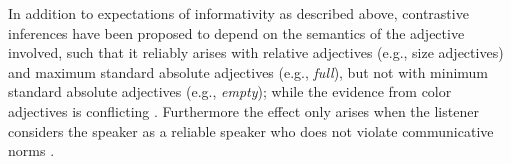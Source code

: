\documentclass[10pt,letterpaper]{article}
\newcommand{\ek}[1]{\textcolor{Orange}{[ek: #1]}}
\newcommand{\jd}[1]{\textcolor{Purple}{[jd: #1]}}
\begin{document}
In addition to expectations of informativity as described above, contrastive inferences have been proposed to depend on the semantics of the adjective involved, such that it reliably arises with relative adjectives (e.g., size adjectives) and maximum standard absolute adjectives (e.g., \textit{full}), but not with minimum standard absolute adjectives (e.g., \textit{empty}); while the evidence from color adjectives is conflicting \cite{Aparicio:2018,Sedivy:2003}. Furthermore the effect only arises when the listener considers the speaker as a reliable speaker who does not violate communicative norms \cite{Grodner:2011,Ryskin:2019}.
\end{document}

